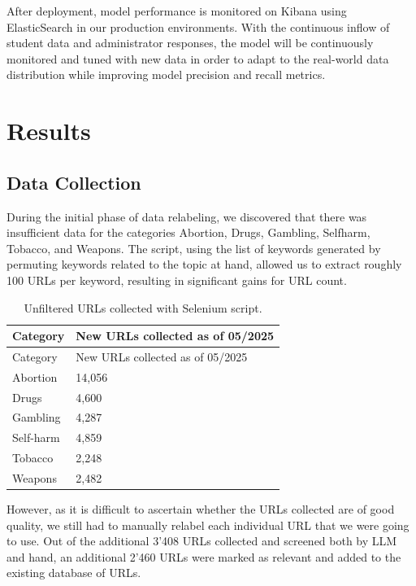 \documentclass[
  titlepage]{article}
\begin{document}
After deployment, model performance is monitored on Kibana using
ElasticSearch in our production environments. With the continuous inflow
of student data and administrator responses, the model will be
continuously monitored and tuned with new data in order to adapt to the
real-world data distribution while improving model precision and recall
metrics.

\section{Results}\label{results}

\subsection{Data Collection}\label{data-collection-1}

During the initial phase of data relabeling, we discovered that there
was insufficient data for the categories Abortion, Drugs, Gambling,
Selfharm, Tobacco, and Weapons. The script, using the list of keywords
generated by permuting keywords related to the topic at hand, allowed us
to extract roughly 100 URLs per keyword, resulting in significant gains
for URL count.

\begin{longtable}[]{@{}ll@{}}
\caption{Unfiltered URLs collected with Selenium script.}\tabularnewline
\toprule\noalign{}
Category & New URLs collected as of 05/2025 \\
\midrule\noalign{}
\endfirsthead
\toprule\noalign{}
Category & New URLs collected as of 05/2025 \\
\midrule\noalign{}
\endhead
\bottomrule\noalign{}
\endlastfoot
Abortion & 14,056 \\
Drugs & 4,600 \\
Gambling & 4,287 \\
Self-harm & 4,859 \\
Tobacco & 2,248 \\
Weapons & 2,482 \\
\end{longtable}

However, as it is difficult to ascertain whether the URLs collected are
of good quality, we still had to manually relabel each individual URL
that we were going to use. Out of the additional 3'408 URLs collected
and screened both by LLM and hand, an additional 2'460 URLs were marked
as relevant and added to the existing database of URLs.
\end{document}
